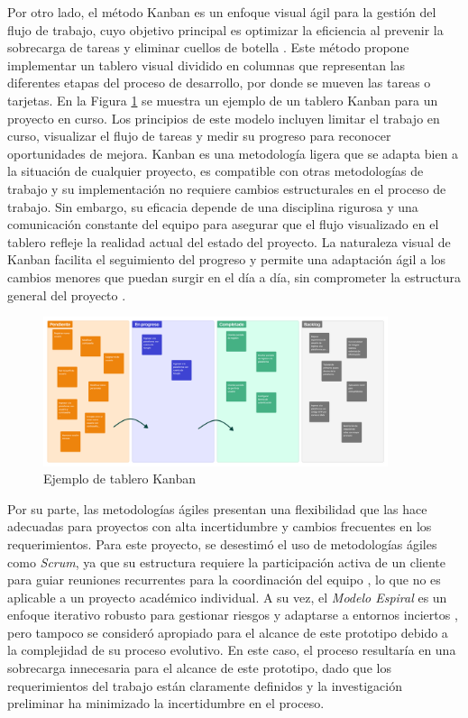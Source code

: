 Por otro lado, el método Kanban es un enfoque visual ágil para la gestión del flujo de trabajo, cuyo objetivo principal es optimizar la eficiencia al prevenir la sobrecarga de tareas y eliminar cuellos de botella \cite{alaidaros2021kanban}. Este método propone implementar un tablero visual dividido en columnas que representan las diferentes etapas del proceso de desarrollo, por donde se mueven las tareas o tarjetas. En la Figura \ref{fig:kanban-board} se muestra un ejemplo de un tablero Kanban para un proyecto en curso. Los principios de este modelo incluyen limitar el trabajo en curso, visualizar el flujo de tareas y medir su progreso para reconocer oportunidades de mejora. Kanban es una metodología ligera que se adapta bien a la situación de cualquier proyecto, es compatible con otras metodologías de trabajo y su implementación no requiere cambios estructurales en el proceso de trabajo. Sin embargo, su eficacia depende de una disciplina rigurosa y una comunicación constante del equipo para asegurar que el flujo visualizado en el tablero refleje la realidad actual del estado del proyecto. La naturaleza visual de Kanban facilita el seguimiento del progreso y permite una adaptación ágil a los cambios menores que puedan surgir en el día a día, sin comprometer la estructura general del proyecto \cite{alaidaros2021kanban}.

\begin{figure}[!tb]
    \centering
    \includegraphics[width=0.9\textwidth]{Figures/model-kanban.png}
    \caption[Tablero Kanban]{Ejemplo de tablero Kanban}
    \label{fig:kanban-board}
\end{figure}

Por su parte, las metodologías ágiles presentan una flexibilidad que las hace adecuadas para proyectos con alta incertidumbre y cambios frecuentes en los requerimientos. Para este proyecto, se desestimó el uso de metodologías ágiles como \textit{Scrum}, ya que su estructura requiere la participación activa de un cliente para guiar reuniones recurrentes para la coordinación del equipo \cite{pressman2010ingenieria}, lo que no es aplicable a un proyecto académico individual. A su vez, el \textit{Modelo Espiral} es un enfoque iterativo robusto para gestionar riesgos y adaptarse a entornos inciertos \cite{pressman2010ingenieria}, pero tampoco se consideró apropiado para el alcance de este prototipo debido a la complejidad de su proceso evolutivo. En este caso, el proceso resultaría en una sobrecarga innecesaria para el alcance de este prototipo, dado que los requerimientos del trabajo están claramente definidos y la investigación preliminar ha minimizado la incertidumbre en el proceso.

